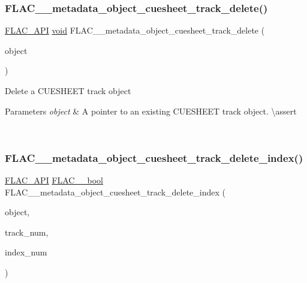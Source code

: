 \subsubsection{\texorpdfstring{FLAC\_\_metadata\_object\_cuesheet\_track\_delete()}{FLAC\_\_metadata\_object\_cuesheet\_track\_delete()}}
{\footnotesize\ttfamily \mbox{\hyperlink{group__flac__export_ga56ca07df8a23310707732b1c0007d6f5}{F\+L\+A\+C\+\_\+\+A\+PI}} \mbox{\hyperlink{_s_d_l__opengles2__gl2ext_8h_ae5d8fa23ad07c48bb609509eae494c95}{void}} F\+L\+A\+C\+\_\+\+\_\+metadata\+\_\+object\+\_\+cuesheet\+\_\+track\+\_\+delete (\begin{DoxyParamCaption}\item[{\mbox{\hyperlink{struct_f_l_a_c_____stream_metadata___cue_sheet___track}{F\+L\+A\+C\+\_\+\+\_\+\+Stream\+Metadata\+\_\+\+Cue\+Sheet\+\_\+\+Track}} $\ast$}]{object }\end{DoxyParamCaption})}

Delete a C\+U\+E\+S\+H\+E\+ET track object


\begin{DoxyParams}{Parameters}
{\em object} & A pointer to an existing C\+U\+E\+S\+H\+E\+ET track object. \textbackslash{}assert 
\begin{DoxyCode}{1}
\end{DoxyCode}
 \\
\hline
\end{DoxyParams}
\mbox{\label{group__flac__metadata__object_ga9cba3429dcc863714ceb1de6952c4737}} 
\subsubsection{\texorpdfstring{FLAC\_\_metadata\_object\_cuesheet\_track\_delete\_index()}{FLAC\_\_metadata\_object\_cuesheet\_track\_delete\_index()}}
{\footnotesize\ttfamily \mbox{\hyperlink{group__flac__export_ga56ca07df8a23310707732b1c0007d6f5}{F\+L\+A\+C\+\_\+\+A\+PI}} \mbox{\hyperlink{ordinals_8h_a95103469f1cbd78b8cf250194985b34e}{F\+L\+A\+C\+\_\+\+\_\+bool}} F\+L\+A\+C\+\_\+\+\_\+metadata\+\_\+object\+\_\+cuesheet\+\_\+track\+\_\+delete\+\_\+index (\begin{DoxyParamCaption}\item[{\mbox{\hyperlink{struct_f_l_a_c_____stream_metadata}{F\+L\+A\+C\+\_\+\+\_\+\+Stream\+Metadata}} $\ast$}]{object,  }\item[{unsigned}]{track\+\_\+num,  }\item[{unsigned}]{index\+\_\+num }\end{DoxyParamCaption})}

